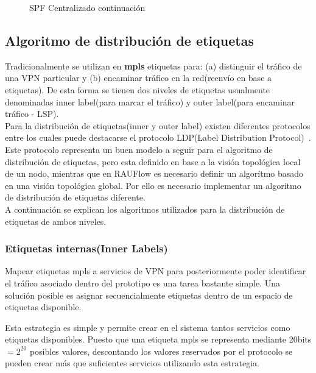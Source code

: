 \begin{figure}[ht!]
\begin{algorithm}[H]
{  
 \vspace{1cm} 
 }
 
\end{algorithm}
\caption[]{SPF Centralizado continuaci\'on}
\end{figure}

\newpage
\subsection{Algoritmo de distribución de etiquetas}
\label{section5.5.4}

Tradicionalmente se utilizan en \textbf{mpls} etiquetas para: (a) distinguir el tr\'afico de una VPN particular y (b) encaminar tr\'afico en la red(reenvío en base a etiquetas). De esta forma se tienen dos niveles de etiquetas usualmente denominadas inner label(para marcar el tr\'afico) y outer label(para encaminar tr\'afico - LSP).\\

Para la distribución de etiquetas(inner y outer label) existen diferentes protocolos entre los cuales puede destacarse el protocolo LDP(Label Distribution Protocol)~\citep{LDPRFC}. Este protocolo representa un buen modelo a seguir para el algoritmo de distribución de etiquetas, pero esta definido en base a la visión topol\'ogica local de un nodo, mientras que en RAUFlow es necesario definir un algor\'itmo basado en una visi\'on topol\'ogica global. Por ello es necesario implementar un algoritmo de distribución de etiquetas diferente.\\

A continuaci\'on se explican los algoritmos utilizados para la distribución de etiquetas de ambos niveles.

\subsubsection{Etiquetas internas(Inner Labels)}
Mapear etiquetas mpls a servicios de VPN para posteriormente poder identificar el tr\'afico asociado dentro del prototipo es una tarea bastante simple. Una soluci\'on posible es asignar secuencialmente etiquetas dentro de un espacio de etiquetas disponible.

Esta estrategia es simple y permite crear en el sistema tantos servicios como etiquetas disponibles. Puesto que una etiqueta mpls se representa mediante 20bits $= 2^{20}$ posibles valores, descontando los  valores reservados por el protocolo se pueden crear m\'as que suficientes servicios utilizando esta estrategia.\\


